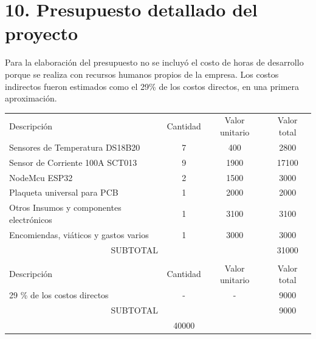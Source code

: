 \documentclass[
11pt, %
]{charter}
\begin{document}
\section{10. Presupuesto detallado del proyecto}
\label{sec:presupuesto}
Para la elaboración del presupuesto no se incluyó el costo de horas de desarrollo porque se realiza con recursos humanos propios de la empresa. Los costos indirectos fueron estimados como el 29\% de los costos directos, en una primera aproximación.

\begin{table}[htpb]
\centering
\begin{tabularx}{\linewidth}{@{}|X|c|r|r|@{}}
\hline
\rowcolor[HTML]{C0C0C0} 
\multicolumn{4}{|c|}{\cellcolor[HTML]{C0C0C0}COSTOS DIRECTOS} \\ \hline
\rowcolor[HTML]{C0C0C0} 
Descripción &
  \multicolumn{1}{c|}{\cellcolor[HTML]{C0C0C0}Cantidad} &
  \multicolumn{1}{c|}{\cellcolor[HTML]{C0C0C0}Valor unitario} &
  \multicolumn{1}{c|}{\cellcolor[HTML]{C0C0C0}Valor total} \\ \hline
Sensores de Temperatura DS18B20 &
  \multicolumn{1}{c|}{7} &
  \multicolumn{1}{c|}{400} &
  \multicolumn{1}{c|}{2800} \\ \hline
Sensor de Corriente 100A SCT013 &
  \multicolumn{1}{c|}{9} &
  \multicolumn{1}{c|}{1900} &
  \multicolumn{1}{c|}{17100} \\ \hline
NodeMcu ESP32 &
  \multicolumn{1}{c|}{2} &
  \multicolumn{1}{c|}{1500} &
  \multicolumn{1}{c|}{3000} \\ \hline
Plaqueta universal para PCB &
  \multicolumn{1}{c|}{1} &
  \multicolumn{1}{c|}{2000} &
  \multicolumn{1}{c|}{2000} \\ \hline
Otros Insumos y componentes electrónicos &
  \multicolumn{1}{c|}{1} &
  \multicolumn{1}{c|}{3100} &
  \multicolumn{1}{c|}{3100} \\ \hline
Encomiendas, viáticos y gastos varios &
  \multicolumn{1}{c|}{1} &
  \multicolumn{1}{c|}{3000} &
  \multicolumn{1}{c|}{3000} \\ \hline
\multicolumn{3}{|c|}{SUBTOTAL} &
  \multicolumn{1}{c|}{31000} \\ \hline
\rowcolor[HTML]{C0C0C0} 
\multicolumn{4}{|c|}{\cellcolor[HTML]{C0C0C0}COSTOS INDIRECTOS} \\ \hline
\rowcolor[HTML]{C0C0C0} 
Descripción &
  \multicolumn{1}{c|}{\cellcolor[HTML]{C0C0C0}Cantidad} &
  \multicolumn{1}{c|}{\cellcolor[HTML]{C0C0C0}Valor unitario} &
  \multicolumn{1}{c|}{\cellcolor[HTML]{C0C0C0}Valor total} \\ \hline
29 \% de los costos directos&
  \multicolumn{1}{c|}{-} &
  \multicolumn{1}{c|}{-} &
  \multicolumn{1}{c|}{9000} \\ \hline
\multicolumn{3}{|c|}{SUBTOTAL} &
  \multicolumn{1}{c|}{9000} \\ \hline
\rowcolor[HTML]{C0C0C0}
\multicolumn{3}{|c|}{TOTAL} &40000
   \\ \hline
\end{tabularx}%
\end{table}
\end{document}
